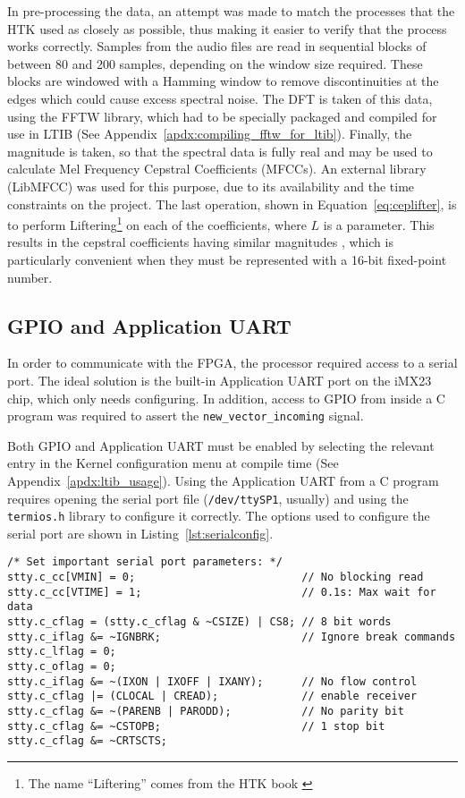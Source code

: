 		In pre-processing the data, an attempt was made to match the processes that the HTK used as closely as possible, thus making it easier to verify that the process works correctly.  Samples from the audio files are read in sequential blocks of between 80 and 200 samples, depending on the window size required.  These blocks are windowed with a Hamming window to remove discontinuities at the edges which could cause excess spectral noise.  The DFT is taken of this data, using the FFTW library, which had to be specially packaged and compiled for use in LTIB (See Appendix~\ref{apdx:compiling_fftw_for_ltib}).  Finally, the magnitude is taken, so that the spectral data is fully real and may be used to calculate Mel Frequency Cepstral Coefficients (MFCCs).  An external library (LibMFCC) was used for this purpose, due to its availability and the time constraints on the project.  The last operation, shown in Equation~\ref{eq:ceplifter}, is to perform Liftering\footnote{The name ``Liftering'' comes from the HTK book \cite{htkbook}} on each of the coefficients, where $L$ is a parameter.  This results in the cepstral coefficients having similar magnitudes \cite{htkbook}, which is particularly convenient when they must be represented with a 16-bit fixed-point number.

	\subsection{GPIO and Application UART} %
	\label{sub:gpio_application_uart}
		In order to communicate with the FPGA, the processor required access to a serial port.  The ideal solution is the built-in Application UART port on the iMX23 chip, which only needs configuring.  In addition, access to GPIO from inside a C program was required to assert the \texttt{new\_vector\_incoming} signal.

		Both GPIO and Application UART must be enabled by selecting the relevant entry in the Kernel configuration menu at compile time (See Appendix~\ref{apdx:ltib_usage}).  Using the Application UART from a C program requires opening the serial port file (\texttt{/dev/ttySP1}, usually) and using the \texttt{termios.h} library to configure it correctly.  The options used to configure the serial port are shown in Listing~\ref{lst:serialconfig}.

\begin{lstlisting}[style=customc, label=lst:serialconfig, caption=Serial Port Configuration]
/* Set important serial port parameters: */
stty.c_cc[VMIN] = 0;                          // No blocking read
stty.c_cc[VTIME] = 1;                         // 0.1s: Max wait for data
stty.c_cflag = (stty.c_cflag & ~CSIZE) | CS8; // 8 bit words
stty.c_iflag &= ~IGNBRK;                      // Ignore break commands
stty.c_lflag = 0;
stty.c_oflag = 0;
stty.c_iflag &= ~(IXON | IXOFF | IXANY);      // No flow control
stty.c_cflag |= (CLOCAL | CREAD);             // enable receiver
stty.c_cflag &= ~(PARENB | PARODD);           // No parity bit
stty.c_cflag &= ~CSTOPB;                      // 1 stop bit
stty.c_cflag &= ~CRTSCTS;
\end{lstlisting}

